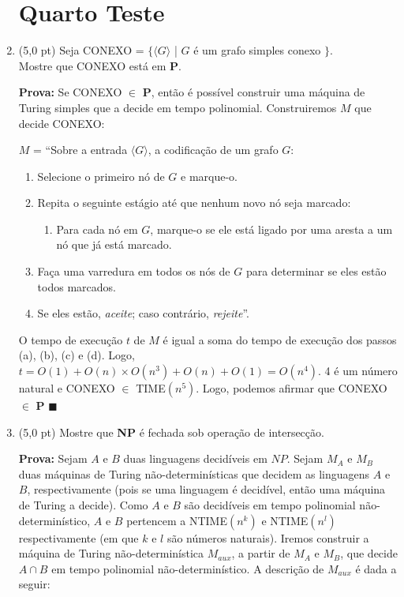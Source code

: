 \documentclass[12pt,a4paper,oneside]{article}
\begin{document}
\begin{enumerate}
		\newpage
		
	
	\section*{Quarto Teste}
	
	\item (5,0 pt) Seja CONEXO = $\{ \langle G \rangle$ | $G$ é um grafo simples conexo $\}$. \\Mostre que CONEXO está em {\bf P}.
	
	\vspace*{0.5cm}
	
	{\color{blue}
		{\bf Prova:} Se CONEXO $\in$ {\bf P}, então é possível construir uma máquina de Turing simples que a decide em tempo polinomial. Construiremos $M$ que decide CONEXO:
			
			$M$ = ``Sobre a entrada $\langle G \rangle$, a codificação de um grafo $G$:
				\begin{enumerate}
					\item Selecione o primeiro nó de $G$ e marque-o.
					\item Repita o seguinte estágio até que nenhum novo nó seja marcado:
						\begin{enumerate}
							\item Para cada nó em $G$, marque-o se ele está ligado por uma aresta a um nó que já está marcado.
						\end{enumerate}
					\item Faça uma varredura em todos os nós de $G$ para determinar se eles estão todos marcados. 
					\item Se eles estão, {\it aceite}; caso contrário, {\it rejeite}''.
				\end{enumerate}
			
			O tempo de execução $t$ de $M$ é igual a soma do tempo de execução dos passos (a), (b), (c) e (d). Logo, $t = O(1) + O(n)\times O(n^3) + O(n) + O(1)= O(n^4)$. 4 é um número natural e CONEXO $\in$ {\sc TIME}$(n^5)$. Logo, podemos afirmar que CONEXO $\in$ {\bf P} $\blacksquare$
	}
	
	\newpage
	
	\item (5,0 pt) Mostre que {\bf NP} é fechada sob operação de intersecção.
	
	\vspace{0.3cm}
	
	{\color{blue}
		{\bf Prova:} Sejam $A$ e $B$ duas linguagens decidíveis em $NP$. Sejam $M_A$ e $M_B$ duas máquinas de Turing não-determinísticas que decidem as linguagens $A$ e $B$, respectivamente (pois se uma linguagem é decidível, então uma máquina de Turing a decide). Como $A$ e $B$ são decidíveis em tempo polinomial não-determinístico, $A$ e $B$ pertencem a {\sc NTIME}$(n^k)$ e {\sc NTIME}$(n^l)$ respectivamente (em que $k$ e $l$ são números naturais).  Iremos construir a máquina de Turing não-determinística $M_{aux}$, a partir de $M_A$ e $M_B$, que decide $A \cap B$ em tempo polinomial não-determi\-nís\-ti\-co. A descrição de $M_{aux}$ é dada a seguir:
			
}
\end{enumerate}
\end{document}
